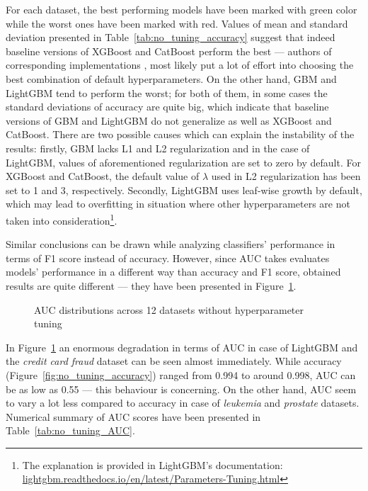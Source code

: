 \documentclass[magisterska, english]{pwr_wmat_praca_dyplomowa}
\theoremstyle{plain}
\numberwithin{theorem}{chapter}
\theoremstyle{definition}
\numberwithin{theorem}{chapter}
\begin{document}
For each dataset, the best performing models have been marked with green color while the worst ones have been marked with red. Values of mean and standard deviation presented in Table~\ref{tab:no_tuning_accuracy} suggest that indeed baseline versions of XGBoost and CatBoost perform the best --- authors of corresponding implementations \cite{xgboost}, \cite{catboost} most likely put a lot of effort into choosing the best combination of default hyperparameters. On the other hand, GBM and LightGBM tend to perform the worst; for both of them, in some cases the standard deviations of accuracy are quite big, which indicate that baseline versions of GBM and LightGBM do not generalize as well as XGBoost and CatBoost. There are two possible causes which can explain the instability of the results: firstly, GBM lacks L1 and L2 regularization and in the case of LightGBM, values of aforementioned regularization are set to zero by default. For XGBoost and CatBoost, the default value of $\lambda$ used in L2 regularization has been set to 1 and 3, respectively. Secondly, LightGBM uses leaf-wise growth by default, which may lead to overfitting in situation where other hyperparameters are not taken into consideration\footnote{The explanation is provided in LightGBM's documentation: \url{lightgbm.readthedocs.io/en/latest/Parameters-Tuning.html}}.  

Similar conclusions can be drawn while analyzing classifiers' performance in terms of F1 score instead of accuracy. However, since AUC takes evaluates models' performance in a different way than accuracy and F1 score, obtained results are quite different --- they have been presented in Figure~\ref{fig:no_tuning_AUC}. 
 
\iffalse
\begin{figure}[H]
	\centering
		\scalebox{0.42}{\texttt{[image: main/plots/results\_f1\_score\_12\_datasets\_no\_tuning\_150\_50\_trees\_facet.pdf]}}
	\caption{F1 score distributions across 12 datasets without hyperparameter tuning}
	\label{fig:no_tuning_F1}
\end{figure}
\fi

\begin{figure}[H]
	\centering
	\caption{AUC distributions across 12 datasets without hyperparameter tuning}
	\label{fig:no_tuning_AUC}
\end{figure}

In Figure~\ref{fig:no_tuning_AUC} an enormous degradation in terms of AUC in case of LightGBM and the \emph{credit card fraud} dataset can be seen almost immediately. While accuracy (Figure~\ref{fig:no_tuning_accuracy}) ranged from 0.994 to around 0.998, AUC can be as low as 0.55 --- this behaviour is concerning. On the other hand, AUC seem to vary a lot less compared to accuracy in case of \emph{leukemia} and \emph{prostate} datasets. Numerical summary of AUC scores have been presented in Table~\ref{tab:no_tuning_AUC}.
\end{document}
